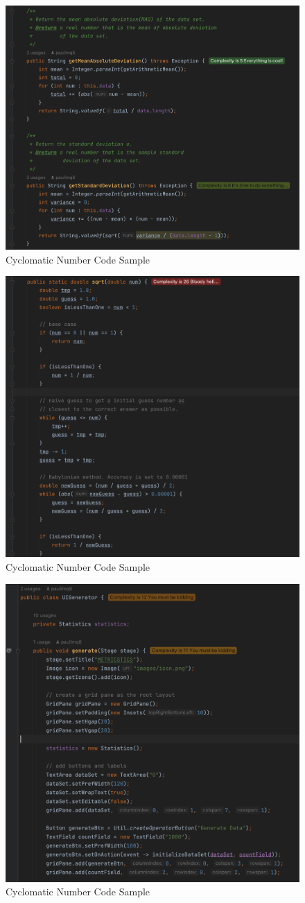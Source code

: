 \documentclass[12pt,letterpaper]{report}
\begin{document}
\begin{figure}
    \begin{center}
    \includegraphics[width=0.5\linewidth]{cc3.png}
    \end{center}
       \caption{Cyclomatic Number Code Sample \label{Code Sample}}
\end{figure}

\begin{figure}
    \begin{center}
    \includegraphics[width=0.5\linewidth]{cc4.png}
    \end{center}
       \caption{Cyclomatic Number Code Sample \label{Code Sample}}
\end{figure}

\begin{figure}
    \begin{center}
    \includegraphics[width=0.5\linewidth]{cc5.png}
    \end{center}
       \caption{Cyclomatic Number Code Sample \label{Code Sample}}
\end{figure}
\end{document}
